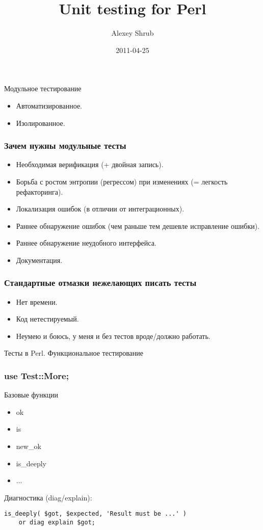 \documentclass[aspectratio=169]{beamer}
\title{Unit testing for Perl}
\author{Alexey Shrub}
\institute{Российские интернет-технологии}
\date{2011-04-25}
\begin{document}
\maketitle

\begin{frame}{Модульное тестирование}
\begin{itemize}
\item Автоматизированное.
\item Изолированное.
\end{itemize}
\end{frame}

\begin{frame}
\frametitle{Зачем нужны модульные тесты}
\begin{itemize}
\item Необходимая верификация (+ двойная запись).
\pause
\item Борьба с ростом энтропии (регрессом) при изменениях (= легкость рефакторинга).
\pause
\item Локализация ошибок (в отличии от интеграционных).
\pause
\item Раннее обнаружение ошибок (чем раньше тем дешевле исправление ошибки).
\pause
\item Раннее обнаружение неудобного интерфейса.
\pause
\item Документация.
\end{itemize}
\end{frame}

\begin{frame}
\frametitle{Стандартные отмазки нежелающих писать тесты}
\begin{itemize}
\item Нет времени.
\item Код нетестируемый.
\item Неумею и боюсь, у меня и без тестов вроде/должно работать.
\end{itemize}
\end{frame}

\begin{frame}
\begin{center}
Тесты в Perl. Функциональное тестирование
\end{center}
\end{frame}

\begin{frame}[fragile]
\frametitle{use Test::More;}
Базовые функции
\begin{itemize}
\item ok
\item is
\item new\_ok
\item is\_deeply
\item ...
\end{itemize}
Диагностика (diag/explain):
\begin{lstlisting}
is_deeply( $got, $expected, 'Result must be ...' )
    or diag explain $got;
\end{lstlisting}
\end{frame}
\end{document}
